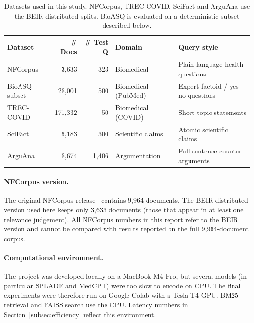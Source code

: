 \documentclass[11pt,a4paper]{article}
\begin{document}
\begin{table}[ht]
\centering
\caption{Datasets used in this study. NFCorpus, TREC-COVID, SciFact and
ArguAna use the BEIR-distributed splits. BioASQ is evaluated on a
deterministic subset described below.}
\label{tab:datasets}
\small
\begin{tabular}{lrrll}
\toprule
\textbf{Dataset} & \textbf{\# Docs} & \textbf{\# Test Q} & \textbf{Domain} & \textbf{Query style} \\
\midrule
NFCorpus      & 3{,}633   & 323     & Biomedical          & Plain-language health questions \\
BioASQ-subset & 28{,}001  & 500     & Biomedical (PubMed) & Expert factoid / yes-no questions \\
TREC-COVID    & 171{,}332 & 50      & Biomedical (COVID)  & Short topic statements \\
SciFact       & 5{,}183   & 300     & Scientific claims   & Atomic scientific claims \\
ArguAna       & 8{,}674   & 1{,}406 & Argumentation       & Full-sentence counter-arguments \\
\bottomrule
\end{tabular}
\end{table}

\paragraph{NFCorpus version.}
The original NFCorpus release~\cite{boteva2016} contains 9{,}964
documents. The BEIR-distributed version used here keeps only 3{,}633
documents (those that appear in at least one relevance judgement). All
NFCorpus numbers in this report refer to the BEIR version and cannot be
compared with results reported on the full 9{,}964-document
corpus.

\paragraph{Computational environment.}
The project was developed locally on a MacBook M4 Pro, but several
models (in particular SPLADE and MedCPT) were too slow to encode on
CPU. The final experiments were therefore run on Google Colab with a
Tesla T4 GPU. BM25 retrieval and FAISS search use the CPU. Latency
numbers in Section~\ref{subsec:efficiency} reflect this environment.
\end{document}
